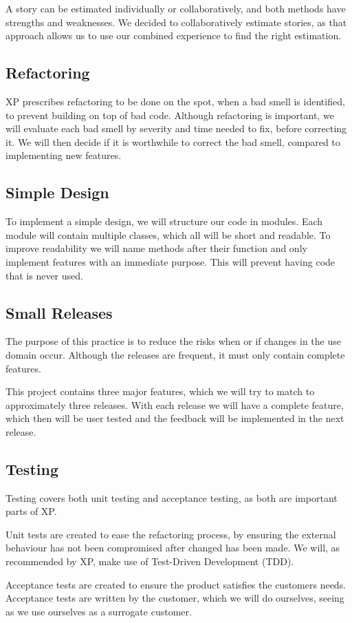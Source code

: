 A story can be estimated individually or collaboratively, and both methods have strengths and weaknesses.
We decided to collaboratively estimate stories, as that approach allows us to use our combined experience to find the right estimation.

\subsection{Refactoring}
XP prescribes refactoring to be done on the spot, when a bad smell is identified, to prevent building on top of bad code.
Although refactoring is important, we will evaluate each bad smell by severity and time needed to fix, before correcting it.
We will then decide if it is worthwhile to correct the bad smell, compared to implementing new features.

\subsection{Simple Design}
To implement a simple design, we will structure our code in modules.
Each module will contain multiple classes, which all will be short and readable.
To improve readability we will name methods after their function and only implement features with an immediate purpose. This will prevent having code that is never used.

\subsection{Small Releases}
The purpose of this practice is to reduce the risks when or if changes in the use domain occur.
Although the releases are frequent, it must only contain complete features.

This project contains three major features, which we will try to match to approximately three releases.
With each release we will have a complete feature, which then will be user tested and the feedback will be implemented in the next release.

\subsection{Testing}
Testing covers both unit testing and acceptance testing, as both are important parts of XP.

Unit tests are created to ease the refactoring process, by ensuring the external behaviour has not been compromised after changed has been made.
We will, as recommended by XP, make use of Test-Driven Development (TDD).

Acceptance tests are created to ensure the product satisfies the customers needs.
Acceptance tests are written by the customer, which we will do ourselves, seeing as we use ourselves as a surrogate customer.

